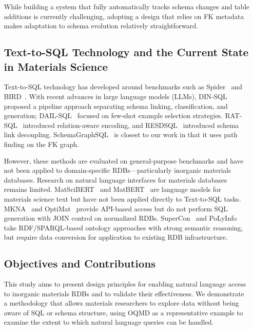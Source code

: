 \documentclass{npj-compt.mater}
\begin{document}
While building a system that fully automatically tracks schema changes
and table additions is currently challenging,
adopting a design that relies on FK metadata makes
adaptation to schema evolution relatively straightforward.

\subsection{Text-to-SQL Technology and the Current State in Materials Science}

Text-to-SQL technology has developed around benchmarks such as
Spider~\cite{yu2018spider} and BIRD~\cite{li2024bird}.
With recent advances in large language models (LLMs),
DIN-SQL~\cite{pourreza2024dinsql} proposed a pipeline approach
separating schema linking, classification, and generation;
DAIL-SQL~\cite{gao2023dail} focused on few-shot example selection strategies.
RAT-SQL~\cite{wang2020ratsql} introduced relation-aware encoding,
and RESDSQL~\cite{li2023resdsql} introduced schema link decoupling.
SchemaGraphSQL~\cite{safdarian2026schemagraphsql} is closest to our work
in that it uses path finding on the FK graph.

However, these methods are evaluated on general-purpose benchmarks
and have not been applied to domain-specific RDBs---particularly
inorganic materials databases.
Research on natural language interfaces for materials databases remains limited.
MatSciBERT~\cite{gupta2022matscibert} and MatBERT~\cite{walker2021matbert} are
language models for materials science text but have not been applied
directly to Text-to-SQL tasks.
MKNA~\cite{zhuang2026mkna} and OptiMat~\cite{hu2026optimat} provide
API-based access but do not perform SQL generation with JOIN control
on normalized RDBs.
SuperCon~\cite{ishii2023supercon} and PoLyInfo~\cite{ishii2024polyinfo}
take RDF/SPARQL-based ontology approaches with strong semantic reasoning,
but require data conversion for application to existing RDB infrastructure.

\subsection{Objectives and Contributions}

This study aims to present design principles for enabling
natural language access to inorganic materials RDBs
and to validate their effectiveness.
We demonstrate a methodology that allows materials researchers
to explore data without being aware of SQL or schema structure,
using OQMD as a representative example to examine the extent to which
natural language queries can be handled.
\end{document}
